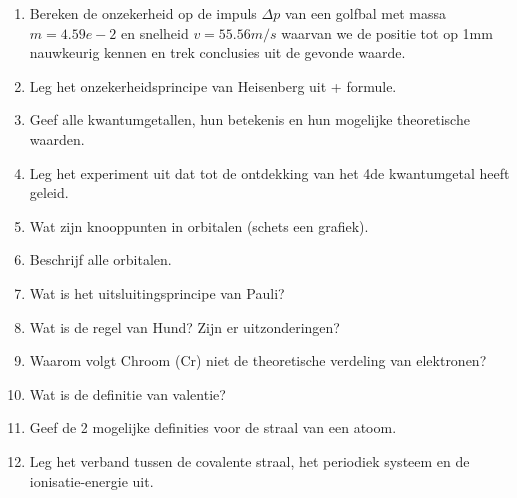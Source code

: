 \documentclass[a4paper,12pt]{article}
\begin{document}
    \begin{enumerate}
        \item Bereken de onzekerheid op de impuls $\Delta p$ van een golfbal met massa $m = 4.59e-2$ en
        snelheid $v = 55.56 m/s$ waarvan we de positie tot op 1mm nauwkeurig kennen en trek conclusies uit de gevonde waarde.
        \item Leg het onzekerheidsprincipe van Heisenberg uit + formule.
        \item Geef alle kwantumgetallen, hun betekenis en hun mogelijke theoretische waarden.
        \item Leg het experiment uit dat tot de ontdekking van het 4de kwantumgetal heeft geleid.
        \item Wat zijn knooppunten in orbitalen (schets een grafiek).
        \item Beschrijf alle orbitalen.
        \item Wat is het uitsluitingsprincipe van Pauli?
        \item Wat is de regel van Hund? Zijn er uitzonderingen?
        \item Waarom volgt Chroom (Cr) niet de theoretische verdeling van elektronen?
        \item Wat is de definitie van valentie?
        \item Geef de 2 mogelijke definities voor de straal van een atoom.
        \item Leg het verband tussen de covalente straal, het periodiek systeem en de ionisatie-energie uit.
    \end{enumerate}

    
\end{document}

